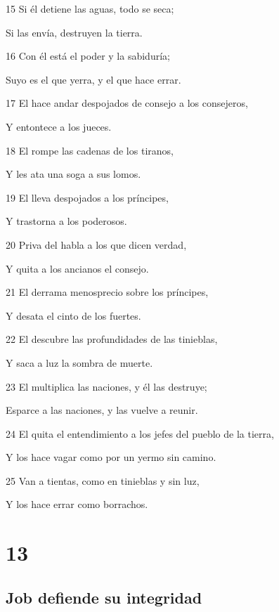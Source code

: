 \par 15 Si él detiene las aguas, todo se seca;
\par Si las envía, destruyen la tierra.
\par 16 Con él está el poder y la sabiduría;
\par Suyo es el que yerra, y el que hace errar. 
\par 17 El hace andar despojados de consejo a los consejeros,
\par Y entontece a los jueces.
\par 18 El rompe las cadenas de los tiranos,
\par Y les ata una soga a sus lomos.
\par 19 El lleva despojados a los príncipes,
\par Y trastorna a los poderosos.
\par 20 Priva del habla a los que dicen verdad,
\par Y quita a los ancianos el consejo. 
\par 21 El derrama menosprecio sobre los príncipes,
\par Y desata el cinto de los fuertes.
\par 22 El descubre las profundidades de las tinieblas,
\par Y saca a luz la sombra de muerte.
\par 23 El multiplica las naciones, y él las destruye;
\par Esparce a las naciones, y las vuelve a reunir.
\par 24 El quita el entendimiento a los jefes del pueblo de la tierra,
\par Y los hace vagar como por un yermo sin camino.
\par 25 Van a tientas, como en tinieblas y sin luz,
\par Y los hace errar como borrachos.

\chapter{13}

\section*{Job defiende su integridad}

